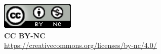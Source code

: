 


\noindent
\includegraphics[]{images/CCBYNC.png}
\\
\textbf{CC BY-NC}
\\
\url{https://creativecommons.org/licenses/by-nc/4.0/}





\setlength{\parskip}{0em}
